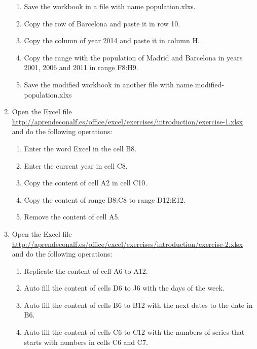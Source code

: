 \begin{enumerate}[leftmargin=*]
\begin{enumerate}
\item Save the workbook in a file with name \textsf{population.xlxs}.

\item Copy the row of Barcelona and paste it in row 10. 

\item Copy the column of year 2014 and paste it in column H. 

\item Copy the range with the population of Madrid and Barcelona in years 2001, 2006 and 2011 in range F8:H9. 

\item Save the modified workbook in another file with name \textsf{modified-population.xlxs}
\end{enumerate}


\item Open the Excel file \url{http://aprendeconalf.es/office/excel/exercises/introduction/exercise-1.xlsx} and do the following
operations:
\begin{enumerate}
\item Enter the word Excel in the cell B8.
\item Enter the current year in cell C8.
\item Copy the content of cell A2 in cell C10.
\item Copy the content of range B8:C8 to range D12:E12.
\item Remove the content of cell A5.
\end{enumerate}

\item Open the Excel file \url{http://aprendeconalf.es/office/excel/exercises/introduction/exercise-2.xlsx} and do the following
operations:
\begin{enumerate}
\item Replicate the content of cell  A6 to A12.
\item Auto fill the content of cells D6 to J6 with the days of the week.
\item Auto fill the content of cells B6 to B12 with the next dates to the date in B6.
\item Auto fill the content of cells C6 to C12 with the numbers of series that starts with numbers in cells  C6 and C7.
\end{enumerate}


\end{enumerate}
